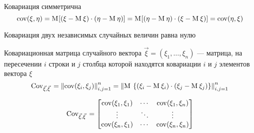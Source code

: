 \begin{remark}
    Ковариация симметрична
    $$\mathrm{cov}\!\left( \xi, \eta \right)
        = \mathrm{M}_{}\!\left[ \left( \xi - \mathrm{M}_{}\,\xi \right)
            \cdot \left( \eta - \mathrm{M}_{}\,\eta \right) \right]
        = \mathrm{M}_{}\!\left[ \left( \eta - \mathrm{M}_{}\,\eta \right)
            \cdot \left( \xi - \mathrm{M}_{}\,\xi \right) \right]
        =\mathrm{cov}\!\left( \eta, \xi \right)$$
\end{remark}

\begin{remark}\label{rem:covIndepentent}
    Ковариация двух независимых случайных величин равна нулю
    \cite[с.~244]{Feller1}
\end{remark}

\begin{definition}
    \label{def:covMatrix}
    \begin{comment}
    Ковариационная матрица двух случайных векторов
    $\vec{\xi} = \left( \xi_1, \dots, \xi_n \right)$ и
    $\vec{\eta} = \left( \eta_1, \dots, \eta_n \right)$ --- матрица, в которой
    на пересечении $i$ строки и $j$ столбца стоит ковариация случайных величин
    $\xi_i$ и $\eta_j$
    $$\Cov{\vec{\xi}}{\vec{\eta}}
        = \left\| \cov{\xi_i, \eta_j} \right\|_{i,j=1}^n
        = \left\| \mean{
            \left\{ \left( \xi_i - \mean{\xi_i} \right)
                \cdot \left( \eta_j - \mean{\eta_j} \right)
            \right\}} \right\|_{i,j=1}^n$$

    $$\Cov{\vec{\xi}}{\vec{\eta}} =
    \begin{bmatrix}
        \cov{\xi_1, \eta_1} & \cdots & \cov{\xi_1, \eta_n} \\
        \vdots & \ddots & \vdots \\
        \cov{\xi_n, \eta_1} & \cdots & \cov{\xi_n, \eta_n}
    \end{bmatrix}$$
    \end{comment}

    Ковариационная матрица случайного вектора
    $\vec{\xi} = \left( \xi_1, \dots, \xi_n \right)$ --- матрица, на пересечении
    $i$ строки и $j$ столбца которой находятся ковариации $i$ и $j$ элементов
    вектора $\xi$
    $$\mathrm{Cov}_{\vec{\xi}, \vec{\xi}}\,
        = \left\| \mathrm{cov}\!\left( \xi_i, \xi_j \right) \right\|_{i,j=1}^n
        = \left\| \mathrm{M}_{}\,
            \left\{ \left( \xi_i - \mathrm{M}_{}\,\xi_i \right)
                \cdot \left( \xi_j - \mathrm{M}_{}\,\xi_j \right)
            \right\} \right\|_{i,j=1}^n$$

    $$\mathrm{Cov}_{\vec{\xi}, \vec{\xi}}\, =
    \begin{bmatrix}
        \mathrm{cov}\!\left( \xi_1, \xi_1 \right) & \cdots & \mathrm{cov}\!\left( \xi_1, \xi_n \right) \\
        \vdots & \ddots & \vdots \\
        \mathrm{cov}\!\left( \xi_n, \xi_1 \right) & \cdots & \mathrm{cov}\!\left( \xi_n, \xi_n \right)
    \end{bmatrix}$$

\end{definition}

